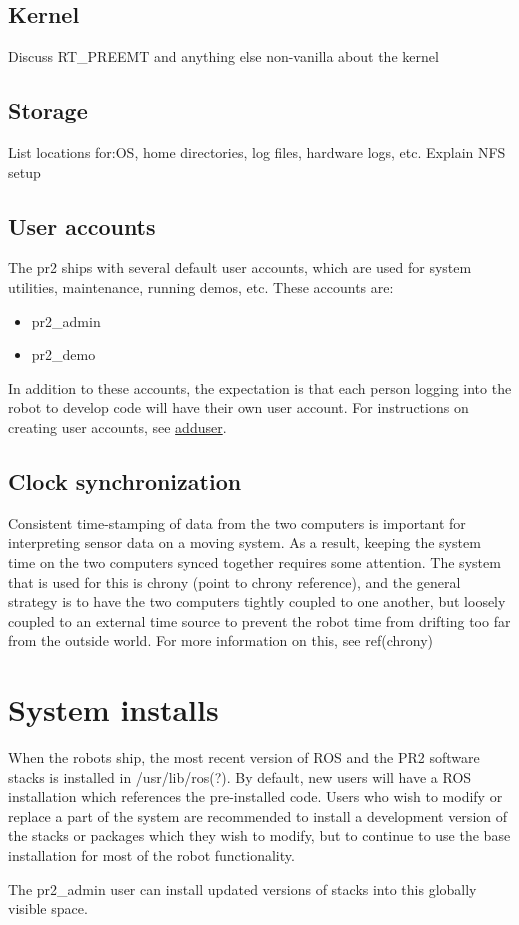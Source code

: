 \subsection{Kernel}
Discuss RT\_PREEMT and anything else non-vanilla about the kernel
\subsection{Storage}
List locations for:OS, home directories, log files, hardware logs, etc.  Explain NFS setup
\subsection{User accounts}
\label{creating accounts}
The pr2 ships with several default user accounts, which are used for system utilities, maintenance, running demos, etc.  These accounts are:
\begin{itemize}
\item{pr2\_admin}
\item{pr2\_demo}
\end{itemize}
In addition to these accounts, the expectation is that each person logging into the robot to develop code will have their own user account.  For instructions on creating user accounts, see \href{http://unixhelp.ed.ac.uk/CGI/man-cgi?adduser}{adduser}.
\subsection{Clock synchronization}
Consistent time-stamping of data from the two computers is important for interpreting sensor data on a moving system.
As a result, keeping the system time on the two computers synced together requires some attention.  The system that is used for this is chrony (point to chrony reference), and the general strategy is to have the two computers tightly coupled to one another, but loosely coupled to an external time source to prevent the robot time from drifting too far from the outside world.  For more information on this, see ref(chrony)
\section{System installs}
When the robots ship, the most recent version of ROS and the PR2 software stacks is installed in /usr/lib/ros(?).  By default, new users will have a ROS installation which references the pre-installed code.  Users who wish to modify or replace a part of the system are recommended to install a development version of the stacks or packages which they wish to modify, but to continue to use the base installation for most of the robot functionality.

The pr2\_admin user can install updated versions of stacks into this globally visible space.


